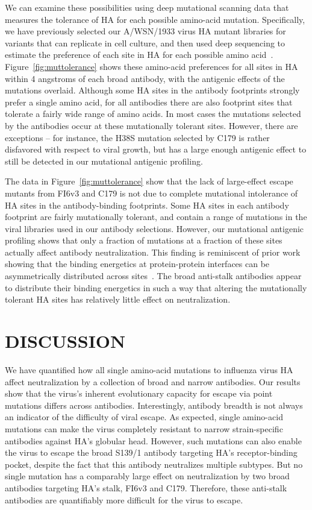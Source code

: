 \documentclass[11pt]{article}
\begin{document}
We can examine these possibilities using deep mutational scanning data that measures the tolerance of HA for each possible amino-acid mutation.
Specifically, we have previously selected our A/WSN/1933 virus HA mutant libraries for variants that can replicate in cell culture, and then used deep sequencing to estimate the preference of each site in HA for each possible amino acid~\citep{doud2016accurate}.
Figure~\ref{fig:muttolerance} shows these amino-acid preferences for all sites in HA within 4 angstroms of each broad antibody, with the antigenic effects of the mutations overlaid.
Although some HA sites in the antibody footprints strongly prefer a single amino acid, for all antibodies there are also footprint sites that tolerate a fairly wide range of amino acids.
In most cases the mutations selected by the antibodies occur at these mutationally tolerant sites.
However, there are exceptions -- for instance, the H38S mutation selected by C179 is rather disfavored with respect to viral growth, but has a large enough antigenic effect to still be detected in our mutational antigenic profiling.

The data in Figure~\ref{fig:muttolerance} show that the lack of large-effect escape mutants from FI6v3 and C179 is not due to complete mutational intolerance of HA sites in the antibody-binding footprints.
Some HA sites in each antibody footprint are fairly mutationally tolerant, and contain a range of mutations in the viral libraries used in our antibody selections.
However, our mutational antigenic profiling shows that only a fraction of mutations at a fraction of these sites actually affect antibody neutralization.
This finding is reminiscent of prior work showing that the binding energetics at protein-protein interfaces can be asymmetrically distributed across sites~\citep{jin1992high,cunningham1993comparison,dall1998mutational}.
The broad anti-stalk antibodies appear to distribute their binding energetics in such a way that altering the mutationally tolerant HA sites has relatively little effect on neutralization.

\section*{DISCUSSION}
We have quantified how all single amino-acid mutations to influenza virus HA affect neutralization by a collection of broad and narrow antibodies.
Our results show that the virus's inherent evolutionary capacity for escape via point mutations differs across antibodies. 
Interestingly, antibody breadth is not always an indicator of the difficulty of viral escape. 
As expected, single amino-acid mutations can make the virus completely resistant to narrow strain-specific antibodies against HA's globular head.
However, such mutations can also enable the virus to escape the broad S139/1 antibody targeting HA's receptor-binding pocket, despite the fact that this antibody neutralizes multiple subtypes.
But no single mutation has a comparably large effect on neutralization by two broad antibodies targeting HA's stalk, FI6v3 and C179.
Therefore, these anti-stalk antibodies are quantifiably more difficult for the virus to escape.
\end{document}
